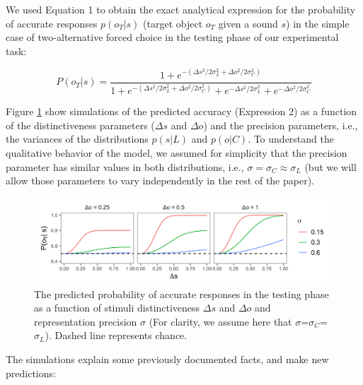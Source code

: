 \documentclass[10pt, letterpaper]{article}
\newenvironment{CodeChunk}{}{}
\begin{document}
We used Equation 1 to obtain the exact analytical expression for the
probability of accurate responses \(p(o_T | s)\) (target object \(o_T\)
given a sound \(s\)) in the simple case of two-alternative forced choice
in the testing phase of our experimental task:

\begin{equation}
P(o_T|s)= \frac{1 + e^{-(\Delta s^2/2\sigma_L^2+ \Delta o^2/2\sigma_C^2)}}{1 + e^{-(\Delta s^2/2\sigma_L^2+ \Delta o^2/2\sigma_C^2)}+ e^{-\Delta s^2 /2\sigma_L^2} + e^{-\Delta o^2 /2\sigma_C^2 }}
\end{equation}

Figure \ref{fig:simulation} show simulations of the predicted accuracy
(Expression 2) as a function of the distinctiveness parameters
(\(\Delta s\) and \(\Delta o\)) and the precision parameters, i.e., the
variances of the distributions \(p(s| L)\) and \(p(o | C)\). To
understand the qualitative behavior of the model, we assumed for
simplicity that the precision parameter has similar values in both
distributions, i.e., \(\sigma =\sigma_C \approx \sigma_L\) (but we will
allow those parameters to vary independently in the rest of the paper).

\begin{CodeChunk}
\begin{figure}[h]

{\centering \includegraphics{figs/simulation-1} 

}

\caption{\label{fig:simulation}The predicted probability of accurate responses in the testing phase as a function of stimuli distinctiveness $\Delta s$ and $\Delta o$ and representation precision $\sigma$ (For clarity, we assume here that $\sigma$=$\sigma_C$=$\sigma_L$). Dashed line represents chance.}\label{fig:simulation}
\end{figure}
\end{CodeChunk}

The simulations explain some previously documented facts, and make new
predictions:
\end{document}
